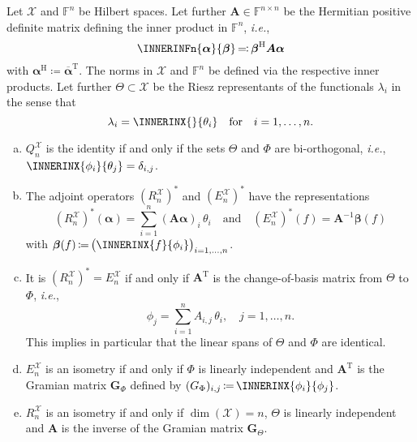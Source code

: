 \documentclass[a4paper]{paper}
\newcommand*{\SPC}[1]{{\ensuremath{\mathscr{#1}}}}
\newcommand*{\SPCX}{\SPC{X}}
\newcommand*{\FIELD}{{\ensuremath{\mathbb{F}}}}
\newcommand*{\Fn}{{\ensuremath{\FIELD^n}}}
\newcommand*{\Fnxn}{{\ensuremath{\FIELD^{n \times n}}}}
\newcommand*{\EXT}[2]{\ensuremath{E_{#1}^{#2}}}
\newcommand*{\REST}[2]{\ensuremath{R_{#1}^{#2}}}
\newcommand*{\COPROJ}[2]{\ensuremath{Q_{#1}^{#2}}}
\newcommand*{\RnX}{{\ensuremath{\REST{n}{\SPC{X}}}}}
\newcommand*{\EnX}{{\ensuremath{\EXT{n}{\SPC{X}}}}}
\newcommand*{\QnX}{{\ensuremath{\COPROJ{n}{\SPCX}}}}
\DeclareMathOperator{\DIM}{{dim}}
\DeclareMathOperator{\DEFEQ}{{\coloneqq}}
\DeclareMathOperator{\EQDEF}{{\eqqcolon}}
\newcommand*{\CCONJ}[1]{{\ensuremath{\overline{#1}}}}
\newcommand*{\TRANSP}[1]{{\ensuremath{#1^{\mathrm{T}}}}}
\newcommand*{\HERM}[1]{{\ensuremath{#1^{\mathrm{H}}}}}
\newcommand*{\ie}{\textsl{i.e.}\xspace}
\newcommand*{\BDalpha}{\boldsymbol{\alpha}}
\newcommand*{\BDbeta}{\boldsymbol{\beta}}
\newcommand*{\BDA}{\boldsymbol{A}}
\newcommand*{\BDG}{\boldsymbol{G}}
\begin{document}
\begin{lemma}
 \label{lemma:specif:funct:op_prop_hilbert}
 Let $\SPCX$ and $\Fn$ be Hilbert spaces. Let further $\BDA \in \Fnxn$ be the Hermitian positive 
 definite matrix defining the inner product in $\Fn$, \ie,
 \begin{equation*}
  \INNERINFn{\BDalpha}{\BDbeta} \EQDEF \HERM{\BDbeta} \BDA \BDalpha
 \end{equation*}
 with $\HERM{\BDalpha} \DEFEQ  \TRANSP{\CCONJ{\BDalpha}}$. The norms in $\SPCX$ and $\Fn$ be defined via 
 the respective inner products. Let further $\Theta \subset \SPCX$ be the Riesz representants of the functionals 
 $\lambda_i$ in the sense that
 \begin{equation*}
  \lambda_i = \INNERINX{}{\theta_i}
  \quad \text{for} \quad 
  i=1,\dots,n.
 \end{equation*}
 \begin{enumerate}[(a)]
  \item \label{lemma:specif:funct:op_prop_hilbert:Q_identity}
  $\QnX$ is the identity if and only if the sets $\Theta$ and $\Phi$ are bi-orthogonal, \ie, 
  $\INNERINX{\phi_i}{\theta_j} = \delta_{i,j}$.
 
  \item \label{lemma:specif:funct:op_prop_hilbert:R_adjoint_repr}
  The adjoint operators $(\RnX)^*$ and $(\EnX)^*$ have the representations
  \begin{equation*}
   (\RnX)^*(\BDalpha) = \sum_{i=1}^n (\BDA \BDalpha)_i\, \theta_i
   \quad \text{and} \quad
   (\EnX)^*(f) = \BDA^{-1} \BDbeta(f)
  \end{equation*}
  with $\BDbeta(f) \DEFEQ \big( \INNERINX{f}{\phi_i} \big)_{i=1,\dots,n}$.
  
  \item \label{lemma:specif:funct:op_prop_hilbert:R_E_adjoint_relation}
  It is $(\RnX)^* = \EnX$ if and only if $\TRANSP{\BDA}$ is the change-of-basis matrix from $\Theta$ to $\Phi$, \ie,
  \begin{equation*}
   \phi_j = \sum_{i=1}^n A_{i,j}\, \theta_i, \quad j=1,\dots,n.
  \end{equation*}
  This implies in particular that the linear spans of $\Theta$ and $\Phi$ are identical.
 
  \item  \label{lemma:specif:funct:op_prop_hilbert:E_isometry}
  $\EnX$ is an isometry if and only if $\Phi$ is linearly independent and $\TRANSP{\BDA}$ is the Gramian matrix 
  $\BDG_\Phi$ defined by $(G_\Phi)_{i,j} \DEFEQ  \INNERINX{\phi_i}{\phi_j}$.
  
  \item \label{lemma:specif:funct:op_prop_hilbert:R_isometry}
  $\RnX$ is an isometry if and only if $\DIM(\SPCX) = n$, $\Theta$ is linearly independent and $\BDA$ is the 
  inverse of the Gramian matrix $\BDG_\Theta$.
 \end{enumerate}
\end{lemma}
\vspace{1em}
\end{document}
